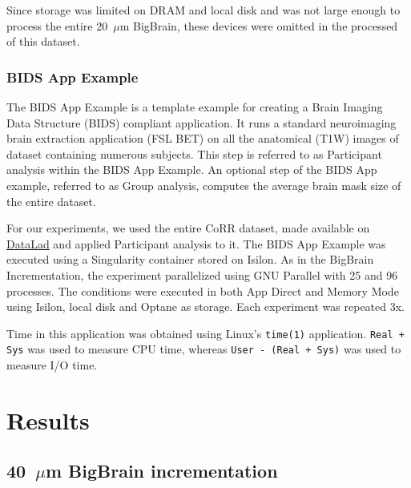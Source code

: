 \documentclass[conference]{IEEEtran}
\newcommand{\bigbrain}{BigBrain\xspace}
\begin{document}
Since storage was limited on DRAM and local disk and was not large enough to process the entire
20~$\mu$m \bigbrain, these devices were omitted in the processed of this dataset. 

\subsubsection{BIDS App Example}

The BIDS App Example is a template example for creating a Brain Imaging Data Structure (BIDS)
compliant application. It runs a standard neuroimaging brain extraction application (FSL BET) 
on all the anatomical (T1W) images of dataset containing numerous subjects. This step is 
referred to as Participant analysis within the BIDS App Example. An optional
step of the BIDS App example, referred to as Group analysis, computes the average brain
mask size of the entire dataset.

For our experiments, we used the entire CoRR dataset, made available on \href{}{DataLad} and
applied Participant analysis to it. The BIDS App Example was executed using a Singularity container stored on
Isilon. As in the BigBrain Incrementation, the experiment parallelized 
using GNU Parallel with 25 and 96 processes. The conditions were executed in both App Direct and Memory Mode
using Isilon, local disk and Optane as storage. Each experiment was repeated 3x.

Time in this application was obtained using Linux's \texttt{time(1)} application.
\texttt{Real + Sys} was used to measure CPU time,
whereas \texttt{User - (Real + Sys)} was used to measure
I/O time.
\section{Results}

\subsection{40~$\mu$m \bigbrain incrementation}
\end{document}
